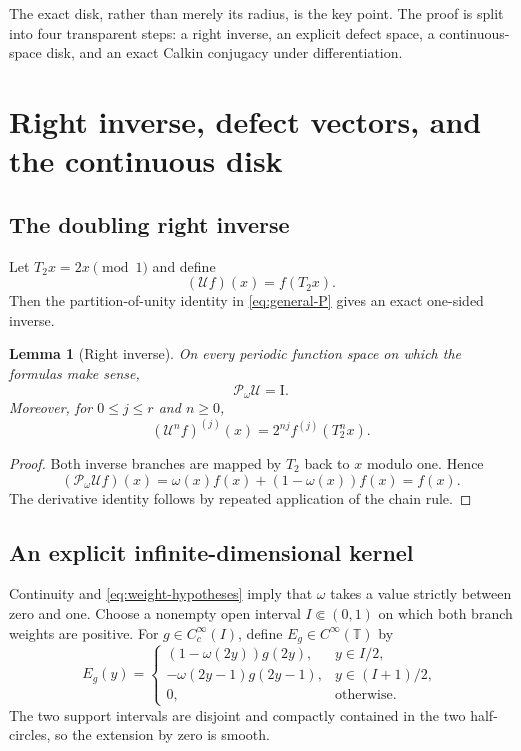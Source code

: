 \documentclass[11pt,a4paper]{article}
\newtheorem{lemma}[theorem]{Lemma}
\theoremstyle{definition}
\theoremstyle{remark}
\newcommand{\T}{\mathbb T}
\newcommand{\Pop}{\mathcal P}
\newcommand{\Uop}{\mathcal U}
\newcommand{\id}{\mathrm I}
\begin{document}
The exact disk, rather than merely its radius, is the key point.  The proof is
split into four transparent steps: a right inverse, an explicit defect space,
a continuous-space disk, and an exact Calkin conjugacy under differentiation.

\section{Right inverse, defect vectors, and the continuous disk}
\label{sec:right-inverse}

\subsection{The doubling right inverse}
Let $T_2x=2x\pmod1$ and define
\begin{equation}
 (\Uop f)(x)=f(T_2x).
 \label{eq:U-definition}
\end{equation}
Then the partition-of-unity identity in \eqref{eq:general-P} gives an exact
one-sided inverse.

\begin{lemma}[Right inverse]
\label{lem:right-inverse}
On every periodic function space on which the formulas make sense,
\begin{equation}
 \Pop_\omega\Uop=\id.
 \label{eq:PU=I}
\end{equation}
Moreover, for $0\le j\le r$ and $n\ge0$,
\begin{equation}
 (\Uop^n f)^{(j)}(x)=2^{nj}f^{(j)}(T_2^n x).
 \label{eq:U-derivatives}
\end{equation}
\end{lemma}
\begin{proof}
Both inverse branches are mapped by $T_2$ back to $x$ modulo one.  Hence
\[
 (\Pop_\omega\Uop f)(x)
 =\omega(x)f(x)+(1-\omega(x))f(x)=f(x).
\]
The derivative identity follows by repeated application of the chain rule.
\end{proof}

\subsection{An explicit infinite-dimensional kernel}
Continuity and \eqref{eq:weight-hypotheses} imply that $\omega$ takes a value
strictly between zero and one.  Choose a nonempty open interval
$I\Subset(0,1)$ on which both branch weights are positive.  For
$g\in C_c^\infty(I)$, define $E_g\in C^\infty(\T)$ by
\begin{equation}
 E_g(y)=
 \begin{cases}
 (1-\omega(2y))g(2y),&y\in I/2,\\
 -\omega(2y-1)g(2y-1),&y\in (I+1)/2,\\
 0,&\text{otherwise}.
 \end{cases}
 \label{eq:defect-vector}
\end{equation}
The two support intervals are disjoint and compactly contained in the two
half-circles, so the extension by zero is smooth.
\end{document}
